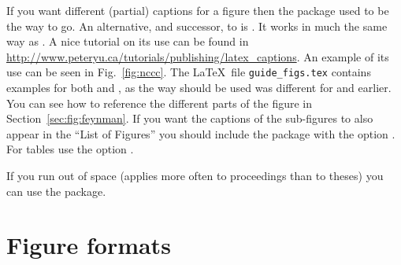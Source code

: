 If you want different (partial) captions for a figure then the
 package used to be the way to go. 
An alternative, and successor, to  is
. It works in much the same way as
. A nice tutorial on its use can be found in
\url{http://www.peteryu.ca/tutorials/publishing/latex_captions}.
An example of its use can be seen in Fig.~\ref{fig:nccc}.
The \LaTeX\ file \texttt{guide\_figs.tex} contains examples for both  and 
, as the way  should be used was
different for  and earlier.
You can see how to reference
the different parts of the figure in Section~\ref{sec:fig:feynman}. If
you want the captions of the sub-figures to also appear in the
\enquote{List of Figures} you should include the package with the
option . For tables use the option .



If you run out of space (applies more often to proceedings than to
theses) you can use the  package.


\section{Figure formats}
\label{sec:fig:formats}


